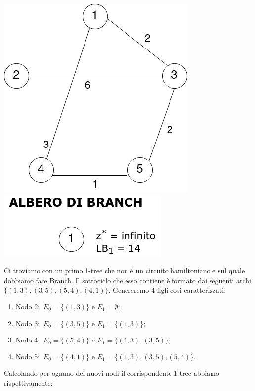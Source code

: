 \documentclass[
	article,			%
	12pt,				%
	oneside,			%
	a4paper,			%
	english,			%
	italian,				%
	sumario=tradicional,
	]{abntex2}
\begin{document}
\begin{center}
    \includegraphics[scale=0.33]{files/primo1Tree.png}
    \qquad \qquad \qquad
    \includegraphics[scale=0.4]{files/alberoBranch1.png}
\end{center}
Ci troviamo con un primo 1-tree che non è un circuito hamiltoniano e sul quale dobbiamo fare Branch. Il sottociclo che esso contiene è formato dai seguenti archi $\{(1,3),(3,5),(5,4),(4,1)\}$. Genereremo 4 figli così caratterizzati:
\begin{enumerate}
    \item [] \underline{Nodo 2}: $\:E_0 = \{(1,3)\}$ e $E_1 = \emptyset$;
    \item [] \underline{Nodo 3}: $\:E_0 = \{(3,5)\}$ e $E_1 = \{(1,3)\}$;
    \item [] \underline{Nodo 4}: $\:E_0 = \{(5,4)\}$ e $E_1 = \{(1,3),(3,5)\}$;
    \item [] \underline{Nodo 5}: $\:E_0 = \{(4,1)\}$ e $E_1 = \{(1,3),(3,5),(5,4)\}$.
\end{enumerate}
Calcolando per ognuno dei nuovi nodi il corrispondente 1-tree abbiamo rispettivamente:
\end{document}
